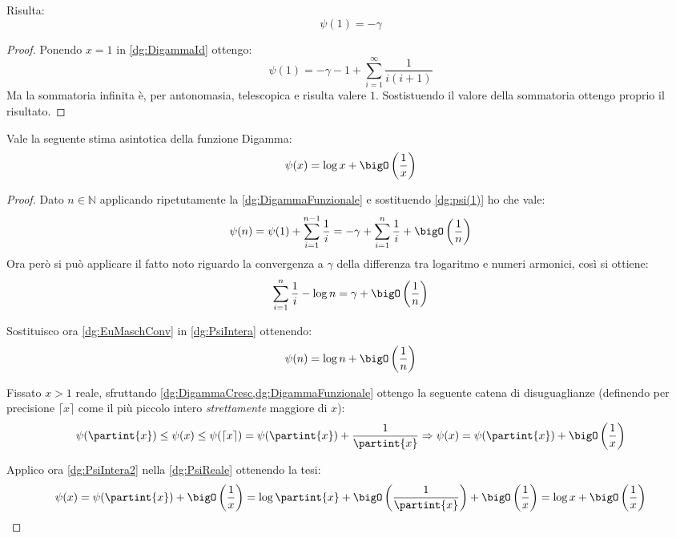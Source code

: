 \begin{corollary}\label{dg:psi(1)}
	Risulta:
	\begin{equation*}
		\psi(1)=-\gamma
	\end{equation*}
\end{corollary}
\begin{proof}
	Ponendo $x=1$ in \cref{dg:DigammaId} ottengo:
	\begin{equation*}
		\psi(1)=-\gamma-1+\sum_{i=1}^{\infty}\frac 1{i(i+1)}
	\end{equation*}
	Ma la sommatoria infinita è, per antonomasia, telescopica e risulta valere $1$. Sostistuendo il valore della sommatoria
	ottengo proprio il risultato.
\end{proof}

\begin{theorem}\label{dg:psiApprox}
	Vale la seguente stima asintotica della funzione Digamma:
	\begin{equation*}
		\psi(x)=\log{x}+\bigO\left(\frac 1x\right)
	\end{equation*}
\end{theorem}
\begin{proof}
	Dato $n\in\mathbb{N}$ applicando ripetutamente la \cref{dg:DigammaFunzionale} e sostituendo \cref{dg:psi(1)}
	ho che vale:
	\begin{equation}\label{dg:PsiIntera}
		\psi(n)=\psi(1)+\sum_{i=1}^{n-1}\frac 1i = -\gamma+\sum_{i=1}^{n}\frac 1i + \bigO\left(\frac 1n\right)
	\end{equation}
	Ora però si può applicare il fatto noto riguardo la convergenza a $\gamma$ della differenza tra logaritmo e numeri armonici, 
	così si ottiene:
	\begin{equation}\label{dg:EuMaschConv}
		\sum_{i=1}^{n}\frac 1i - \log n = \gamma +\bigO\left(\frac 1n\right)
	\end{equation}
	
	Sostituisco ora \cref{dg:EuMaschConv} in \cref{dg:PsiIntera} ottenendo:
	\begin{equation}\label{dg:PsiIntera2}
		\psi(n)=\log n +\bigO\left(\frac 1n\right)
	\end{equation}

	Fissato $x>1$ reale, sfruttando \cref{dg:DigammaCresc,dg:DigammaFunzionale} ottengo la seguente catena di
	disuguaglianze (definendo per precisione $\lceil x\rceil$ come il più piccolo intero \emph{strettamente} maggiore di $x$):
	\begin{equation}\label{dg:PsiReale}
		\psi(\partint{x})\le \psi(x) \le \psi(\lceil x\rceil)=\psi(\partint{x})+\frac 1{\partint{x}} \Rightarrow
		\psi(x)=\psi(\partint{x})+\bigO\left(\frac 1x\right)
	\end{equation}

	Applico ora \cref{dg:PsiIntera2} nella \cref{dg:PsiReale} ottenendo la tesi:
	\begin{equation*}
		\psi(x)=\psi(\partint{x})+\bigO\left(\frac 1x\right)=
		\log{\partint{x} }+\bigO\left(\frac 1{\partint{x}}\right)+\bigO\left(\frac 1x\right)=
		\log{x}+\bigO\left(\frac 1x\right)
	\end{equation*}
\end{proof}


